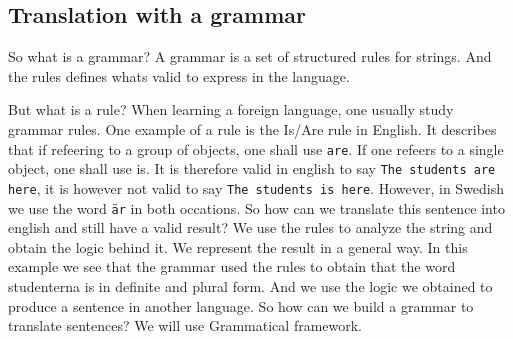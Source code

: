 \documentclass[
10pt, %
a4paper, %
oneside, %
headinclude,footinclude, %
BCOR5mm, %
]{scrartcl}
\begin{document}
\subsection{Translation with a grammar}
So what is a grammar? A grammar is a set of structured rules for strings. And the rules defines whats valid to express in the language.

But what is a rule? When learning a foreign language, one usually study grammar rules. One example of a rule is the Is/Are rule in English.
\newline
\newline
 It describes that if refeering to a group of objects, one shall use \texttt{are}. If one refeers to a single object, one shall use is. It is therefore valid in english to say \texttt{The students are here}, it is however not valid to say \texttt{The students is here}.
\newline
\newline
However, in Swedish we use the word \texttt{är} in both occations. So how can we translate this sentence into english and still have a valid result?
\newline
\newline
We use the rules to analyze the string and obtain the logic behind it. We represent the result in a general way. In this example we see that the grammar used the rules to obtain that the word studenterna is in definite and plural form.
\newline
\newline
And we use the logic we obtained to produce a sentence in another language.
\newline
\newline
So how can we build a grammar to translate sentences? We will use Grammatical framework.
\end{document}
